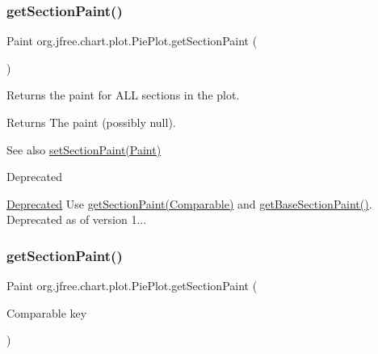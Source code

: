 \subsubsection{\texorpdfstring{get\+Section\+Paint()}{getSectionPaint()}\hspace{0.1cm}{\footnotesize\ttfamily [1/3]}}
{\footnotesize\ttfamily Paint org.\+jfree.\+chart.\+plot.\+Pie\+Plot.\+get\+Section\+Paint (\begin{DoxyParamCaption}{ }\end{DoxyParamCaption})}

Returns the paint for A\+LL sections in the plot.

\begin{DoxyReturn}{Returns}
The paint (possibly {\ttfamily null}).
\end{DoxyReturn}
\begin{DoxySeeAlso}{See also}
\mbox{\hyperlink{classorg_1_1jfree_1_1chart_1_1plot_1_1_pie_plot_a201122096ae318cb6e976a7a9596c500}{set\+Section\+Paint(\+Paint)}}
\end{DoxySeeAlso}
\begin{DoxyRefDesc}{Deprecated}
\item[\mbox{\hyperlink{deprecated__deprecated000063}{Deprecated}}]Use \mbox{\hyperlink{classorg_1_1jfree_1_1chart_1_1plot_1_1_pie_plot_a3de4031e87303ad438571b42b698324b}{get\+Section\+Paint(\+Comparable)}} and \mbox{\hyperlink{classorg_1_1jfree_1_1chart_1_1plot_1_1_pie_plot_a3f62bcd5bca8122fa099f9607f75d93a}{get\+Base\+Section\+Paint()}}. Deprecated as of version 1... \end{DoxyRefDesc}
\mbox{\label{classorg_1_1jfree_1_1chart_1_1plot_1_1_pie_plot_a3de4031e87303ad438571b42b698324b}} 
\subsubsection{\texorpdfstring{get\+Section\+Paint()}{getSectionPaint()}\hspace{0.1cm}{\footnotesize\ttfamily [2/3]}}
{\footnotesize\ttfamily Paint org.\+jfree.\+chart.\+plot.\+Pie\+Plot.\+get\+Section\+Paint (\begin{DoxyParamCaption}\item[{Comparable}]{key }\end{DoxyParamCaption})}

